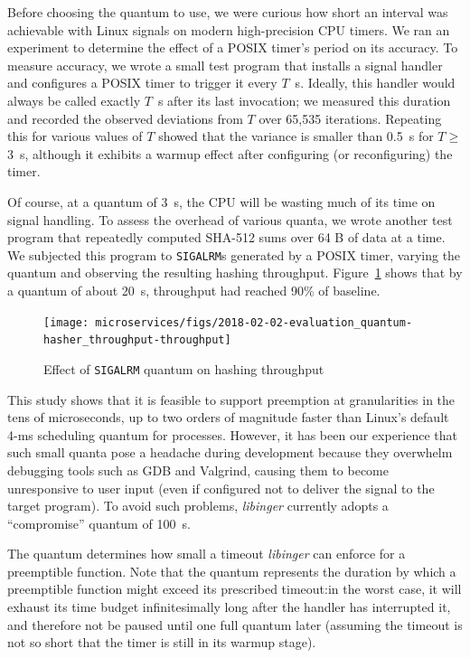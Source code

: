 Before choosing the quantum to use, we were curious how short an interval was
achievable with
Linux signals on modern high-precision CPU timers.  We ran an experiment to determine
the effect of a POSIX timer's period on its accuracy.  To measure accuracy, we wrote
a small test program that installs a signal handler and configures a POSIX timer to
trigger it every $T$~\textmu{}s.  Ideally, this handler would always be called
exactly $T$~\textmu{}s after its last invocation; we measured this duration and
recorded the observed deviations from $T$ over 65,535 iterations.  Repeating this
for various values of $T$ showed that the variance is smaller than 0.5~\textmu{}s for
$T \ge$ 3~\textmu{}s, although it exhibits a warmup effect after configuring (or
reconfiguring) the timer.

Of course, at a quantum of 3~\textmu{}s, the CPU will be wasting much of its time on
signal handling.  To assess the overhead of various quanta, we wrote another test
program
that repeatedly computed SHA-512 sums over 64 B of data at a time.  We subjected this
program to \texttt{SIGALRM}s generated by a POSIX timer, varying the quantum and
observing the resulting hashing throughput.  Figure~\ref{fig:shatput} shows that by a
quantum of about 20~\textmu{}s, throughput had reached 90\% of baseline.

\begin{figure}
\texttt{[image: microservices/figs/2018-02-02-evaluation\_quantum-hasher\_throughput-throughput]}
\caption{Effect of \texttt{SIGALRM} quantum on hashing throughput}
\label{fig:shatput}
\end{figure}

This study shows that it is feasible to support preemption at granularities in the
tens of microseconds, up to two orders of magnitude faster than Linux's default 4-ms
scheduling quantum for processes.  However, it has been our experience that such
small quanta pose a headache during development because they overwhelm debugging
tools such as GDB and Valgrind, causing them to become unresponsive to user input
(even if configured not to deliver the signal to the target program).  To avoid such
problems, \textit{libinger} currently adopts a ``compromise'' quantum of
100~\textmu{}s.

The quantum determines how small a timeout \textit{libinger} can enforce for a
preemptible function.  Note that the quantum represents the duration by which a
preemptible
function might exceed its prescribed timeout:\@ in the worst case, it will exhaust
its time budget infinitesimally long after the handler has interrupted it, and
therefore not be paused until one full quantum later (assuming the timeout is not so
short that the timer is still in its warmup stage).

